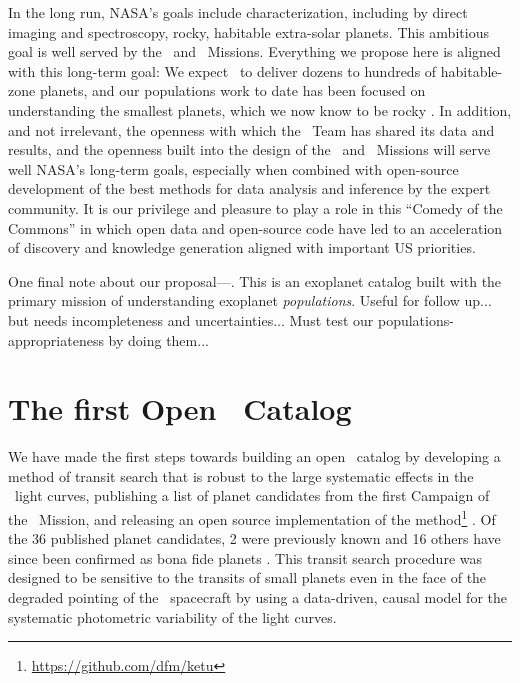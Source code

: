 \documentclass[12pt,preprint]{aastex}
\begin{document}
In the long run, NASA's goals include characterization, including by
direct imaging and spectroscopy, rocky, habitable extra-solar planets.
This ambitious goal is well served by the \kepler\ and \kt\ Missions.
Everything we propose here is aligned with this long-term goal:
We expect \kt\ to deliver dozens to hundreds of habitable-zone
planets, and our populations work to date has been focused on
understanding the smallest planets, which we now know to be rocky
\citep{Rogers:2015}.
In addition, and not irrelevant, the openness with which the
\kepler\ Team has shared its data and results, and the openness built
into the design of the \kt\ and \tess\ Missions will serve well NASA's
long-term goals, especially when combined with open-source development
of the best methods for data analysis and inference by the expert
community.
It is our privilege and pleasure to play a role in this ``Comedy of
the Commons'' in which open data and open-source code have led to an
acceleration of discovery and knowledge generation aligned with
important US priorities.

One final note about our proposal---\thecatalog.
This is an exoplanet catalog built with the primary mission of understanding exoplanet \emph{populations}.
Useful for follow up...
but needs incompleteness and uncertainties...
Must test our populations-appropriateness by doing them...

\section{The first Open \ketu\ Catalog}

We have made the first steps towards building an open \ketu\ catalog by
developing a method of transit search that is robust to the large systematic
effects in the \ketu\ light curves, publishing a list of planet candidates
from the first Campaign of the \ketu\ Mission, and releasing an open source
implementation of the method\footnote{\url{https://github.com/dfm/ketu}}
\citep{Foreman-Mackey:2015}.
Of the 36 published planet candidates, 2 were previously known
\citep{Crossfield:2015} and 16 others have since been confirmed as bona fide
planets \citep{Armstrong:2015, Montet:2015}.
This transit search procedure was designed to be sensitive to the transits of
small planets even in the face of the degraded pointing of the \kepler\
spacecraft by using a data-driven, causal model for the systematic photometric
variability of the light curves.
\end{document}
